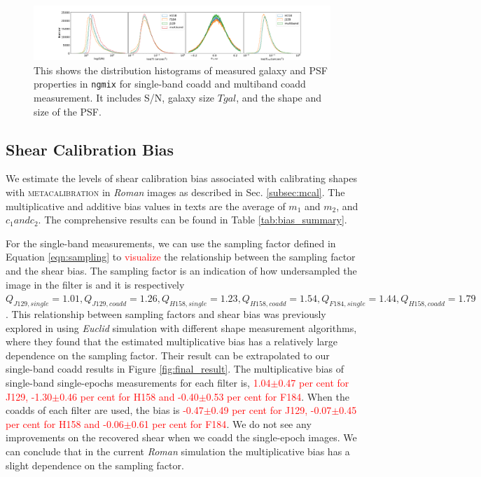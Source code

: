 \documentclass[fleqn,usenatbib]{mnras}
\begin{document}
\begin{figure}
    \hspace*{-3.0cm}
    \centering
	\includegraphics[scale=0.34]{ngmix_snr_T.pdf}
    \caption{This shows the distribution histograms of measured galaxy and PSF properties in \texttt{ngmix} for single-band coadd and multiband coadd measurement. It includes S/N, galaxy size $T{gal}$, and the shape and size of the PSF.}
    \label{fig:measured_properties}
\end{figure}


\subsection{Shear Calibration Bias}
\label{subsec:shapes}
We estimate the levels of shear calibration bias associated with calibrating shapes with \textsc{metacalibration} in \emph{Roman} images as described in Sec. \ref{subsec:mcal}. The multiplicative and additive bias values in texts are the average of $m_{1}$ and $m_{2}$, and $c_{1} and c_{2}$. The comprehensive results can be found in Table \ref{tab:bias_summary}.  

For the single-band measurements, we can use the sampling factor defined in Equation \ref{eqn:sampling} to \textcolor{red}{visualize} the relationship between the sampling factor and the shear bias. The sampling factor is an indication of how undersampled the image in the filter is and it is respectively $Q_{J129,single}=1.01, Q_{J129,coadd}=1.26, Q_{H158,single}=1.23, Q_{H158,coadd}=1.54, Q_{F184,single}=1.44, Q_{H158,coadd}=1.79$. This relationship between sampling factors and shear bias was previously explored in \citealt{2021MNRAS.502.4048K} using \emph{Euclid} simulation with different shape measurement algorithms, where they found that the estimated multiplicative bias has a relatively large dependence on the sampling factor. Their result can be extrapolated to our single-band coadd results in Figure \ref{fig:final_result}. The multiplicative bias of single-band single-epochs measurements for each filter is, \textcolor{red}{1.04$\pm$0.47 per cent for J129, -1.30$\pm$0.46 per cent for H158 and -0.40$\pm$0.53 per cent for F184}. When the coadds of each filter are used, the bias is \textcolor{red}{-0.47$\pm$0.49 per cent for J129, -0.07$\pm$0.45 per cent for H158 and -0.06$\pm$0.61 per cent for F184}. We do not see any improvements on the recovered shear when we coadd the single-epoch images. We can conclude that in the current \emph{Roman} simulation the multiplicative bias has a slight dependence on the sampling factor.
\end{document}
